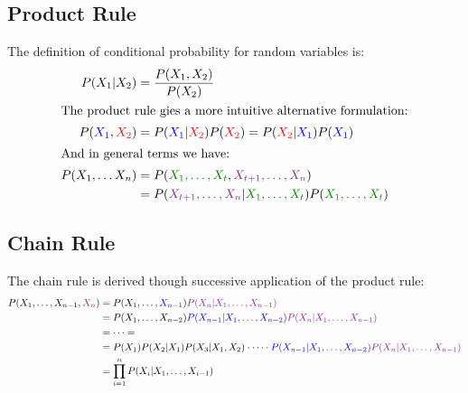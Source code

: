 \documentclass{article}
\def\blu#1{{\color{blu}#1}}
\def\gre#1{{\color{gre}#1}}
\def\red#1{{\color{red}#1}}
\begin{document}
\subsection*{Product Rule}
The definition of conditional probability for random variables is:
\begin{align*}
P(X_1 | X_2) &= \frac{P(X_1 , X_2)}{P(X_2)} \\
\intertext{The product rule gies a more intuitive alternative formulation:}
P(\blu{X_1}, \red{X_2}) &= P(\blu{X_1} | \red{X_2})P(\red{X_2}) = P(\red{X_2} | \blu{X_1})P(\blu{X_1})\\
\intertext{And in general terms we have:}
P(X_1, \dots X_n) &= P(\gre{X_1, \dots, X_t}, {\color{Fuchsia}X_{t+1}, \dots , X_n}) \\
&= P({\color{Fuchsia}X_{t+1}, \dots , X_n} | \gre{X_1, \dots, X_t})P(\gre{X_1, \dots, X_t})
\end{align*}

\subsection*{Chain Rule}
The chain rule is derived though successive application of the product rule:
\begin{align*}
P(X_1, \dots, X_{n-1}, {\color{Fuchsia}X_n}) &= P(X_1, \dots, \blu{X_{n-1}}){\color{Fuchsia}P(X_n | X_1, \dots, X_{n-1})} \\
&= P(X_1, \dots, X_{n-2})\blu{P(X_{n-1} | X_1, \dots, X_{n-2})}{\color{Fuchsia}P(X_n | X_1, \dots, X_{n-1})}\\
&= \dots = \\
&= P(X_1)P(X_2 | X_1)P(X_3 | X_1, X_2)\cdot \dots \cdot \blu{P(X_{n-1} | X_1, \dots, X_{n-2})}{\color{Fuchsia}P(X_n | X_1, \dots, X_{n-1})}\\
&= \prod_{i = 1}^n P(X_i | X_1, \dots, X_{i-1})
\end{align*}
\end{document}
